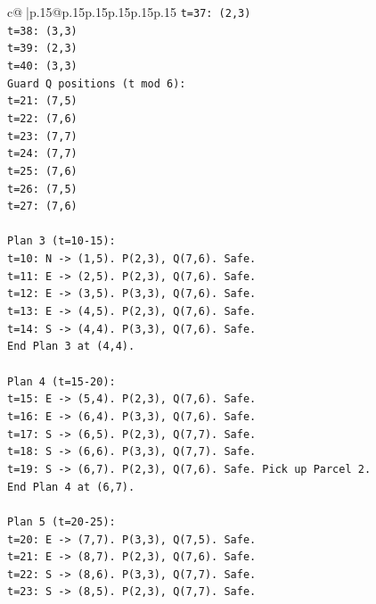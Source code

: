 \documentclass{article}
\begin{document}
{\begin{supertabular}{c@{$\;$}|p{.15\linewidth}@{}p{.15\linewidth}p{.15\linewidth}p{.15\linewidth}p{.15\linewidth}p{.15\linewidth}}
{{{\texttt{t=37: (2,3)} \\
\texttt{t=38: (3,3)} \\
\texttt{t=39: (2,3)} \\
\texttt{t=40: (3,3)} \\
\texttt{Guard Q positions (t mod 6):} \\
\texttt{t=21: (7,5)} \\
\texttt{t=22: (7,6)} \\
\texttt{t=23: (7,7)} \\
\texttt{t=24: (7,7)} \\
\texttt{t=25: (7,6)} \\
\texttt{t=26: (7,5)} \\
\texttt{t=27: (7,6)} \\
\\ 
\texttt{Plan 3 (t=10{-}15):} \\
\texttt{t=10: N {-}> (1,5). P(2,3), Q(7,6). Safe.} \\
\texttt{t=11: E {-}> (2,5). P(2,3), Q(7,6). Safe.} \\
\texttt{t=12: E {-}> (3,5). P(3,3), Q(7,6). Safe.} \\
\texttt{t=13: E {-}> (4,5). P(2,3), Q(7,6). Safe.} \\
\texttt{t=14: S {-}> (4,4). P(3,3), Q(7,6). Safe.} \\
\texttt{End Plan 3 at (4,4).} \\
\\ 
\texttt{Plan 4 (t=15{-}20):} \\
\texttt{t=15: E {-}> (5,4). P(2,3), Q(7,6). Safe.} \\
\texttt{t=16: E {-}> (6,4). P(3,3), Q(7,6). Safe.} \\
\texttt{t=17: S {-}> (6,5). P(2,3), Q(7,7). Safe.} \\
\texttt{t=18: S {-}> (6,6). P(3,3), Q(7,7). Safe.} \\
\texttt{t=19: S {-}> (6,7). P(2,3), Q(7,6). Safe. Pick up Parcel 2.} \\
\texttt{End Plan 4 at (6,7).} \\
\\ 
\texttt{Plan 5 (t=20{-}25):} \\
\texttt{t=20: E {-}> (7,7). P(3,3), Q(7,5). Safe.} \\
\texttt{t=21: E {-}> (8,7). P(2,3), Q(7,6). Safe.} \\
\texttt{t=22: S {-}> (8,6). P(3,3), Q(7,7). Safe.} \\
\texttt{t=23: S {-}> (8,5). P(2,3), Q(7,7). Safe.} \\
}}}
\end{supertabular}}
\end{document}
